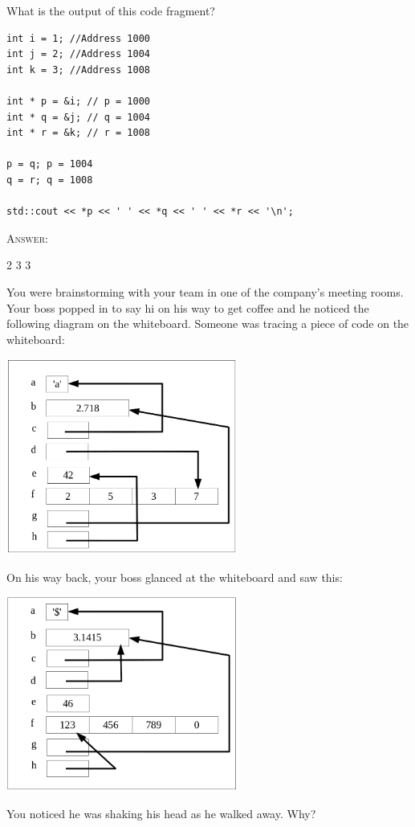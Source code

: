 \newpage
\nextq
What is the output of this code fragment?
\begin{Verbatim}[frame=single]
int i = 1; //Address 1000
int j = 2; //Address 1004
int k = 3; //Address 1008

int * p = &i; // p = 1000
int * q = &j; // q = 1004
int * r = &k; // r = 1008

p = q; p = 1004
q = r; q = 1008

std::cout << *p << ' ' << *q << ' ' << *r << '\n'; 
\end{Verbatim}

\textsc{Answer:}
\begin{answercode}
2 3 3
\end{answercode}

\newpage
\nextq
You were brainstorming with your team in one of the company's meeting rooms.
Your boss popped in to say hi on his way to get coffee and
he noticed the following diagram on the whiteboard.
Someone was tracing a piece of code on the whiteboard:
\begin{center}
  \includegraphics[width=3in]{pic1.PNG}
\end{center}
On his way back, your boss glanced at the whiteboard and saw this:
\begin{center}
  \includegraphics[width=3in]{pic2.PNG}
\end{center}
You noticed he was shaking his head as he walked away. Why?

